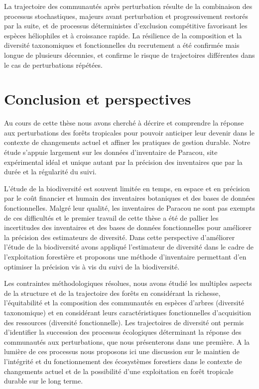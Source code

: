 \documentclass[11pt,french,A4paper,extrafontsizes,onecolumn,openright]{memoir}
\begin{document}
La trajectoire des communautés après perturbation résulte de la
combinaison des processus stochastiques, majeurs avant perturbation et
progressivement restorés par la suite, et de processus déterministes
d'exclusion compétitive favorisant les espèces héliophiles et à
croissance rapide. La résilience de la composition et la diversité
taxonomiques et fonctionnelles du recrutement a été confirmée mais
longue de plusieurs décennies, et confirme le risque de trajectoires
différentes dans le cas de perturbations répétées.

\chapter{Conclusion et perspectives}\label{conclusion-et-perspectives}

Au cours de cette thèse nous avons cherché à décrire et comprendre la
réponse aux perturbations des forêts tropicales pour pouvoir anticiper
leur devenir dans le contexte de changements actuel et affiner les
pratiques de gestion durable. Notre étude s'appuie largement sur les
données d'inventaire de Paracou, site expérimental idéal et unique
autant par la précision des inventaires que par la durée et la
régularité du suivi.

L'étude de la biodiversité est souvent limitée en temps, en espace et en
précision par le coût financier et humain des inventaires botaniques et
des bases de données fonctionnelles. Malgré leur qualité, les
inventaires de Paracou ne sont pas exempts de ces difficultés et le
premier travail de cette thèse a été de pallier les incertitudes des
inventaires et des bases de données fonctionnelles pour améliorer la
précision des estimateurs de diversité. Dans cette perspective
d'améliorer l'étude de la biodiversité avons appliqué l'estimateur de
diversité dans le cadre de l'exploitation forestière et proposons une
méthode d'inventaire permettant d'en optimiser la précision vis à vis du
suivi de la biodiversité.

Les contraintes méthodologiques résolues, nous avons étudié les
multiples aspects de la structure et de la trajectoire des forêts en
considérant la richesse, l'équitabilité et la composition des
communautés en espèces d'arbres (diversité taxonomique) et en
considérant leurs caractéristiques fonctionnelles d'acquisition des
ressources (diversité fonctionnelle). Les trajectoires de diversité ont
permis d'identifier la succession des processus écologiques déterminant
la réponse des communautés aux perturbations, que nous présenterons dans
une première. A la lumière de ces processus nous proposons ici une
discussion sur le maintien de l'intégrité et du fonctionnement des
écosystèmes forestiers dans le contexte de changements actuel et de la
possibilité d'une exploitation en forêt tropicale durable sur le long
terme.
\end{document}
